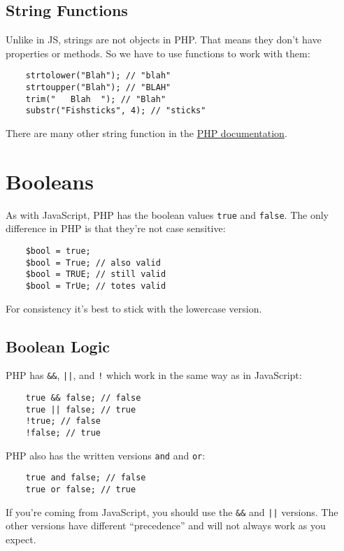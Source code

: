 \subsection{String Functions}

Unlike in JS, strings are not objects in PHP. That means they don't have properties or methods. So we have to use functions to work with them:

\begin{verbatim}
    strtolower("Blah"); // "blah"
    strtoupper("Blah"); // "BLAH"
    trim("   Blah  "); // "Blah"
    substr("Fishsticks", 4); // "sticks"
\end{verbatim}

There are many other string function in the \href{http://www.php.net/manual/en/ref.strings.php}{PHP documentation}.


\section{Booleans}

As with JavaScript, PHP has the boolean values \texttt{true} and \texttt{false}. The only difference in PHP is that they're not case sensitive:

\begin{verbatim}
    $bool = true;
    $bool = True; // also valid
    $bool = TRUE; // still valid
    $bool = TrUe; // totes valid
\end{verbatim}

For consistency it's best to stick with the lowercase version.

\subsection{Boolean Logic}

PHP has \texttt{\&\&}, \texttt{||}, and \texttt{!} which work in the same way as in JavaScript:

\begin{verbatim}
    true && false; // false
    true || false; // true
    !true; // false
    !false; // true
\end{verbatim}

PHP also has the written versions \texttt{and} and \texttt{or}:

\begin{verbatim}
    true and false; // false
    true or false; // true
\end{verbatim}

If you're coming from JavaScript, you should use the \texttt{\&\&} and \texttt{||} versions. The other versions have different ``precedence'' and will not always work as you expect.

